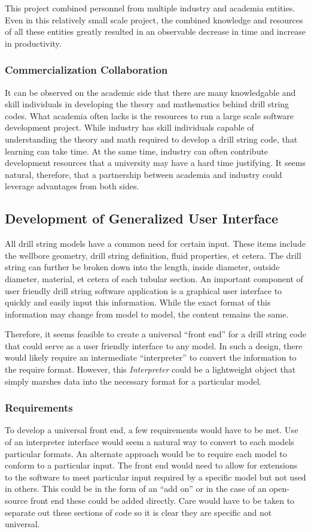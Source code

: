 This project combined personnel from multiple industry and academia entities.  Even in this relatively small scale project, the combined knowledge and resources of all these entities greatly resulted in an observable decrease in time and increase in productivity.

\subsubsection{Commercialization Collaboration}
It can be observed on the academic side that there are many knowledgable and skill individuals in developing the theory and mathematics behind drill string codes.  What academia often lacks is the resources to run a large scale software development project.  While industry has skill individuals capable of understanding the theory and math required to develop a drill string code, that learning can take time.  At the same time, industry can often contribute development resources that a university may have a hard time justifying.  It seems natural, therefore, that a partnership between academia and industry could leverage advantages from both sides.

\subsection{Development of Generalized User Interface}
All drill string models have a common need for certain input.  These items include the wellbore geometry, drill string definition, fluid properties, et cetera.  The drill string can further be broken down into the length, inside diameter, outside diameter, material, et cetera of each tubular section.  An important component of user friendly drill string software application is a graphical user interface to quickly and easily input this information.  While the exact format of this information may change from model to model, the content remains the same.

Therefore, it seems feasible to create a universal ``front end'' for a drill string code that could serve as a user friendly interface to any model.  In such a design, there would likely require an intermediate ``interpreter'' to convert the information to the require format.  However, this \emph{Interpreter} could be a lightweight object that simply marshes data into the necessary format for a particular model.

\subsubsection{Requirements}
To develop a universal front end, a few requirements would have to be met.  Use of an interpreter interface would seem a natural way to convert to each models particular formats.  An alternate approach would be to require each model to conform to a particular input.  The front end would need to allow for extensions to the software to meet particular input required by a specific model but not used in others.  This could be in the form of an ``add on'' or in the case of an open-source front end these could be added directly.  Care would have to be taken to separate out these sections of code so it is clear they are specific and not universal.

